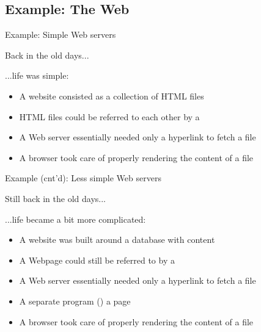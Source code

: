 \subsection{Example: The Web}
\begin{slide}{Example: Simple Web servers}
  \begin{block}{Back in the old days...}
    \centering{}
  \end{block}
  \begin{block}{...life was simple:}
    \begin{itemize}\firmlist
    \item A website consisted as a collection of HTML files
    \item HTML files could be referred to each other by a 
    \item A Web server essentially needed only a hyperlink to fetch a file
    \item A browser took care of properly rendering the content of a file
    \end{itemize}
  \end{block}
\end{slide}
\begin{slide}{Example (cnt'd): Less simple Web servers}
  \begin{block}{Still back in the old days...}
    \centering{}
  \end{block}
  \begin{block}{...life became a bit more complicated:}
    \begin{itemize}\firmlist
    \item A website was built around a database with content
    \item A Webpage could still be referred to by a 
    \item A Web server essentially needed only a hyperlink to fetch a file
    \item A separate program ()  a page
    \item A browser took care of properly rendering the content of a file
    \end{itemize}
  \end{block}

\end{slide}
